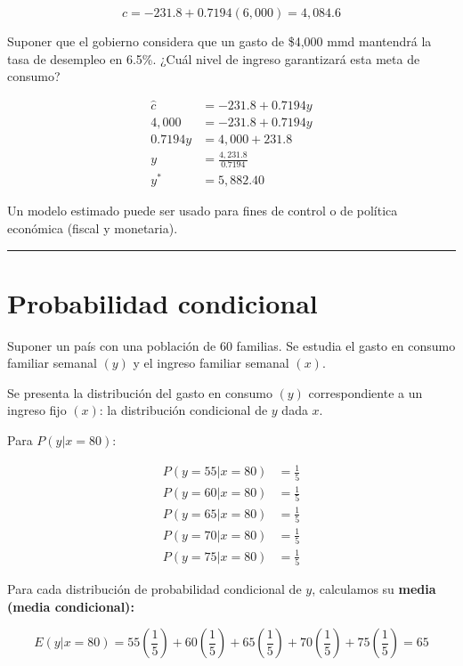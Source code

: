 \documentclass[
]{book}
\begin{document}
\[
\hat c = -231.8 + 0.7194(6,000) = 4,084.6 
\]

Suponer que el gobierno considera que un gasto de \$4,000 mmd mantendrá la tasa de desempleo en 6.5\%. ¿Cuál nivel de ingreso garantizará esta meta de consumo?

\[
\begin{aligned} 
\hat c &= -231.8 + 0.7194y \\
4,000 &= -231.8 + 0.7194y \\ 
0.7194y &= 4,000 + 231.8 \\ 
y &= \frac{4,231.8}{0.7194} \\ 
y^* &= 5,882.40 
\end{aligned}
\]

Un modelo estimado puede ser usado para fines de control o de política económica (fiscal y monetaria).

\begin{center}\rule{0.5\linewidth}{0.5pt}\end{center}

\hypertarget{probabilidad-condicional}{%
\section{Probabilidad condicional}\label{probabilidad-condicional}}

Suponer un país con una población de 60 familias. Se estudia el gasto en consumo familiar semanal \((y)\) y el ingreso familiar semanal \((x)\).

Se presenta la distribución del gasto en consumo \((y)\) correspondiente a un ingreso fijo \((x)\): la distribución condicional de \(y\) dada \(x\).

Para \(P(y|x = 80)\):

\[ 
\begin{aligned} 
P(y=55|x=80) &= \frac{1}{5} \\ 
P(y=60|x=80) &= \frac{1}{5} \\ 
P(y=65|x=80) &= \frac{1}{5} \\ 
P(y=70|x=80) &= \frac{1}{5} \\ 
P(y=75|x=80) &= \frac{1}{5} 
\end{aligned} 
\]

Para cada distribución de probabilidad condicional de \(y\), calculamos su \textbf{media (media condicional):}

\[ 
E(y|x=80) = 55\left( \frac{1}{5} \right) + 60\left( \frac{1}{5} \right) + 65\left( \frac{1}{5} \right) + 70\left( \frac{1}{5} \right) + 75\left( \frac{1}{5} \right) = 65
\]
\end{document}
